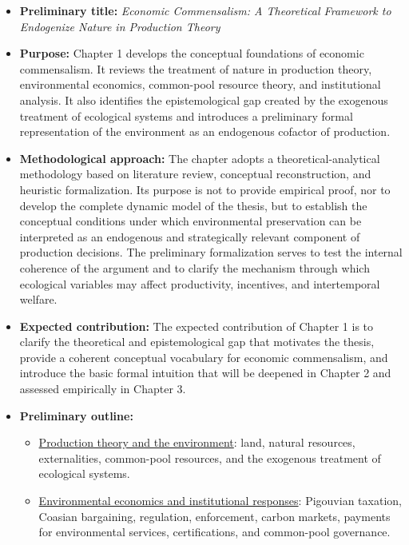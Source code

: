 \begin{itemize}

    \item \textbf{Preliminary title:} \emph{Economic Commensalism: A Theoretical Framework to Endogenize Nature in Production Theory}

    \item \textbf{Purpose:} Chapter 1 develops the conceptual foundations of economic commensalism. It reviews the treatment of nature in production theory, environmental economics, common-pool resource theory, and institutional analysis. It also identifies the epistemological gap created by the exogenous treatment of ecological systems and introduces a preliminary formal representation of the environment as an endogenous cofactor of production.

    \item \textbf{Methodological approach:} The chapter adopts a theoretical-analytical methodology based on literature review, conceptual reconstruction, and heuristic formalization. Its purpose is not to provide empirical proof, nor to develop the complete dynamic model of the thesis, but to establish the conceptual conditions under which environmental preservation can be interpreted as an endogenous and strategically relevant component of production decisions. The preliminary formalization serves to test the internal coherence of the argument and to clarify the mechanism through which ecological variables may affect productivity, incentives, and intertemporal welfare.

    \item \textbf{Expected contribution:} The expected contribution of Chapter 1 is to clarify the theoretical and epistemological gap that motivates the thesis, provide a coherent conceptual vocabulary for economic commensalism, and introduce the basic formal intuition that will be deepened in Chapter 2 and assessed empirically in Chapter 3.

    \item \textbf{Preliminary outline:}

    \begin{itemize}

        \item[i.] \underline{Production theory and the environment}: land, natural resources, externalities, common-pool resources, and the exogenous treatment of ecological systems.

        \item[ii.] \underline{Environmental economics and institutional responses}: Pigouvian taxation, Coasian bargaining, regulation, enforcement, carbon markets, payments for environmental services, certifications, and common-pool governance.


\end{itemize}
\end{itemize}
